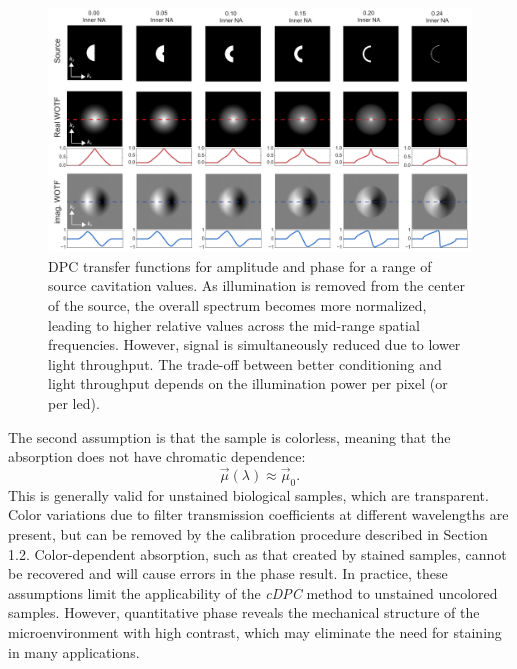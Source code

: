 \begin{figure}[tb]
    \centering
    \includegraphics[width=\textwidth]{figures/fig_phase_dpc_opt_transfer.pdf}
    \caption{\label{fig:phase:cavitated_transfer_functions}
    DPC transfer functions for amplitude and phase for a range of source cavitation values. As illumination is removed from the center of the source, the overall spectrum becomes more normalized, leading to higher relative values across the mid-range spatial frequencies. However, signal is simultaneously reduced due to lower light throughput. The trade-off between better conditioning and light throughput depends on the illumination power per pixel (or per led).}
\end{figure}

The second assumption is that the sample is colorless, meaning that the absorption does not have chromatic dependence:
\begin{equation} \label{outEq:monochrome}
\vec{\mu}(\lambda) \approx \vec{\mu}_0.
\end{equation}
\noindent This is generally valid for unstained biological samples, which are transparent. Color variations due to filter transmission coefficients at different wavelengths are present, but can be removed by the calibration procedure described in Section 1.2. Color-dependent absorption, such as that created by stained samples, cannot be recovered and will cause errors in the phase result. In practice, these assumptions limit the applicability of the \textit{cDPC} method to unstained uncolored samples. However, quantitative phase reveals the mechanical structure of the microenvironment with high contrast, which may eliminate the need for staining in many applications.

